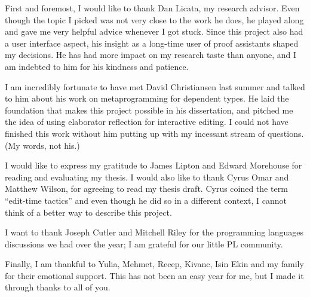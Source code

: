 \documentclass[11pt, ma]{westhesis}
\theoremstyle{plain}
\theoremstyle{definition}
\begin{document}
\begin{acknowledgements}
First and foremost, I would like to thank Dan Licata, my research advisor.
Even though the topic I picked was not very close to the work he does, he
played along and gave me very helpful advice whenever I got stuck.
Since this project also had a user interface aspect, his insight as a
long-time user of proof assistants shaped my decisions.
He has had more impact on my research taste than anyone, and I am indebted to
him for his kindness and patience.

I am incredibly fortunate to have met David Christiansen last summer and talked
to him about his work on metaprogramming for dependent types.
He laid the foundation that makes this project possible in his
dissertation\cite{davidphd}, and pitched me the idea of using elaborator
reflection for interactive editing.
I could not have finished this work without him putting up with my incessant
stream of questions. (My words, not his.)

I would like to express my gratitude to James Lipton and Edward Morehouse for
reading and evaluating my thesis. I would also like to thank Cyrus Omar and
Matthew Wilson, for agreeing to read my thesis draft. Cyrus coined the term
``edit-time tactics'' and even though he did so in a different
context\cite{hazelnut}, I cannot think of a better way to describe this
project.

I want to thank Joseph Cutler and Mitchell Riley for the programming languages
discussions we had over the year; I am grateful for our little PL community.

Finally, I am thankful to Yulia, Mehmet, Recep, Kivanc, Isin Ekin and
my family for their emotional support. This has not been an easy year for me,
but I made it through thanks to all of you.
\end{acknowledgements}

\frontmatter
\maketitle
\makeabstract
\makededication
\makeack

\tableofcontents

\mainmatter












\end{document}
